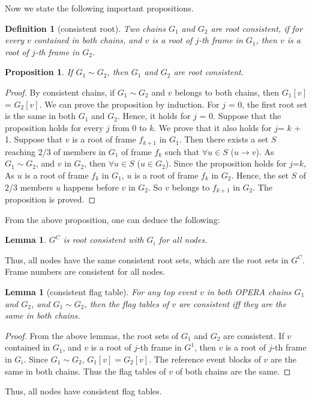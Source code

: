 \documentclass{article}
\newtheorem{lem}[thm]{Lemma}
\newtheorem{prop}[thm]{Proposition}
\newtheorem{defn}{Definition}[section]
\newcommand{\hbefore}{\rightarrow}
\begin{document}
Now we state the following important propositions.
\begin{defn}[consistent root]
	Two chains $G_1$ and $G_2$ are root consistent, if for every $v$ contained in both chains, and $v$ is a root of $j$-th frame in $G_1$, then $v$ is a root of $j$-th frame in $G_2$.
\end{defn}
\begin{prop}
	If $G_1 \sim G_2$, then $G_1$ and $G_2$ are root consistent.
\end{prop}
\begin{proof}
	By consistent chains, if $G_1 \sim G_2$ and $v$ belongs to both chains, then $G_1[v]$ = $G_2[v]$.
	We can prove the proposition by induction. For $j$ = 0, the first root set is the same in both $G_1$ and $G_2$. Hence, it holds for $j$ = 0. Suppose that the proposition holds for every $j$ from 0 to $k$. We prove that it also holds for $j$= $k$ + 1.
	 Suppose that $v$ is a root of frame $f_{k+1}$ in $G_1$. 
	Then there exists a set $S$ reaching 2/3 of members in $G_1$ of frame $f_k$ such that $\forall u \in S$ ($u\hbefore v$). As $G_1 \sim G_2$, and $v$ in $G_2$, then $\forall u \in S$ ($u \in G_2$). Since the proposition holds for $j$=$k$, 
	As $u$ is a root of frame $f_{k}$ in $G_1$, $u$ is a root of frame $f_k$ in $G_2$. Hence, the set $S$ of 2/3 members $u$ happens before $v$ in $G_2$. So $v$ belongs to $f_{k+1}$ in $G_2$. The proposition is proved.
\end{proof}

From the above proposition, one can deduce the following:
\begin{lem}
		$G^C$ is root consistent with $G_i$ for all nodes.
 \end{lem}
Thus, all nodes have the same consistent root sets, which are the root sets in $G^C$. Frame numbers are consistent for all nodes.


\begin{lem}[consistent flag table] For any top event $v$ in both OPERA chains $G_1$ and $G_2$, and $G_1 \sim G_2$, then the flag tables of $v$ are consistent iff they are the same in both chains.
\end{lem}
\begin{proof}
	From the above lemmas, the root sets of $G_1$ and $G_2$ are consistent. If $v$ contained in $G_1$, and $v$ is a root of $j$-th frame in $G^1$, then $v$ is a root of $j$-th frame in $G_i$. Since $G_1 \sim G_2$, $G_1[v] = G_2[v]$. The reference event blocks of $v$ are the same in both chains. Thus the flag tables of $v$ of both chains are the same.
\end{proof}
Thus, all nodes have consistent flag tables.
\end{document}
